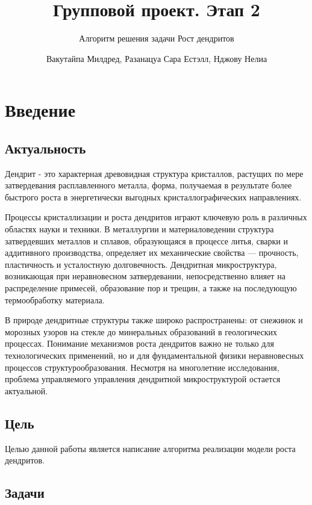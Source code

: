 \documentclass[
  12pt,
  a4paper,
  DIV=11,
  numbers=noendperiod]{scrreprt}
\title{Групповой проект. Этап 2}
\subtitle{Алгоритм решения задачи Рост дендритов}
\author{Вакутайпа Милдред, Разанацуа Сара Естэлл, Нджову Нелиа}
\date{}
\renewcommand*\contentsname{Содержание}
\newcommand\contentsname{Содержание}
\begin{document}
\maketitle

\renewcommand*\contentsname{Содержание}
{
\setcounter{tocdepth}{1}
\tableofcontents
}
\listoffigures
\listoftables
{}
\chapter{Введение}\label{ux432ux432ux435ux434ux435ux43dux438ux435}

\section{Актуальность}\label{ux430ux43aux442ux443ux430ux43bux44cux43dux43eux441ux442ux44c}

Дендрит - это характерная древовидная структура кристаллов, растущих по
мере затвердевания расплавленного металла, форма, получаемая в
результате более быстрого роста в энергетически выгодных
кристаллографических направлениях.

Процессы кристаллизации и роста дендритов играют ключевую роль в
различных областях науки и техники. В металлургии и материаловедении
структура затвердевших металлов и сплавов, образующаяся в процессе
литья, сварки и аддитивного производства, определяет их механические
свойства --- прочность, пластичность и усталостную долговечность.
Дендритная микроструктура, возникающая при неравновесном затвердевании,
непосредственно влияет на распределение примесей, образование пор и
трещин, а также на последующую термообработку материала.

В природе дендритные структуры также широко распространены: от снежинок
и морозных узоров на стекле до минеральных образований в геологических
процессах. Понимание механизмов роста дендритов важно не только для
технологических применений, но и для фундаментальной физики
неравновесных процессов структурообразования. Несмотря на многолетние
исследования, проблема управляемого управления дендритной
микроструктурой остается актуальной.

\section{Цель}\label{ux446ux435ux43bux44c}

Целью данной работы является написание алгоритма реализации модели роста
дендритов.

\section{Задачи}\label{ux437ux430ux434ux430ux447ux438}
\end{document}
